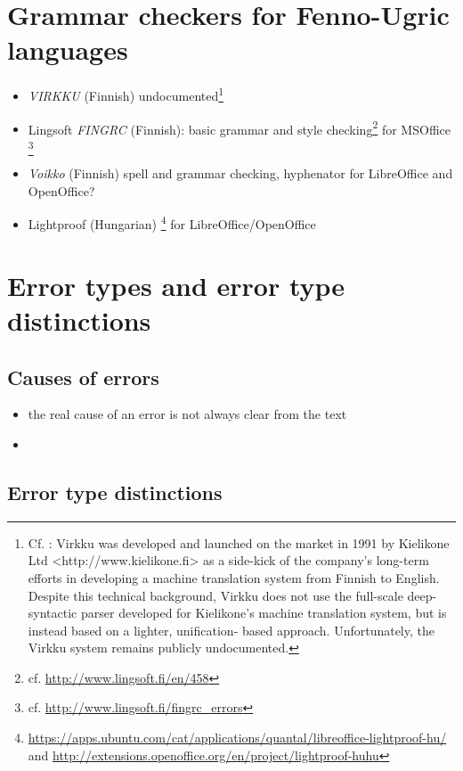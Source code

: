 \documentclass[a4paper,english,12pt]{article}
\begin{document}
\begin{spacing}{1.0}
\section{Grammar checkers for Fenno-Ugric languages}

\begin{itemize}
\item \textit{VIRKKU} (Finnish) undocumented\footnote{Cf. \cite{Arppe2000}: Virkku was developed and launched on the market in 1991 by Kielikone Ltd <http://www.kielikone.fi> as a side-kick of the company’s long-term efforts in developing a machine translation system from Finnish to English. Despite this technical background, Virkku does not use the full-scale deep-syntactic parser developed for Kielikone’s machine translation system, but is instead based on a lighter, unification- based approach. Unfortunately, the Virkku system remains publicly undocumented. } 
\item Lingsoft \textit{FINGRC} (Finnish): basic grammar and style checking\footnote{cf. \url{http://www.lingsoft.fi/en/458}} for MSOffice \footnote{cf. \url{http://www.lingsoft.fi/fingrc_errors}} 
\item \textit{Voikko} (Finnish) spell and grammar checking,  hyphenator for LibreOffice and OpenOffice?
\item Lightproof (Hungarian) \footnote{\url{https://apps.ubuntu.com/cat/applications/quantal/libreoffice-lightproof-hu/} and \url{http://extensions.openoffice.org/en/project/lightproof-huhu}} for LibreOffice/OpenOffice 
\end{itemize}


\section{Error types and error type distinctions}

\subsection{Causes of errors}

\begin{itemize}
\item the real cause of an error is not always clear from the text \cite[p.27]{Sofkova2003}
\item 
\end{itemize}

\subsection{Error type distinctions}


\end{spacing}
\end{document}
